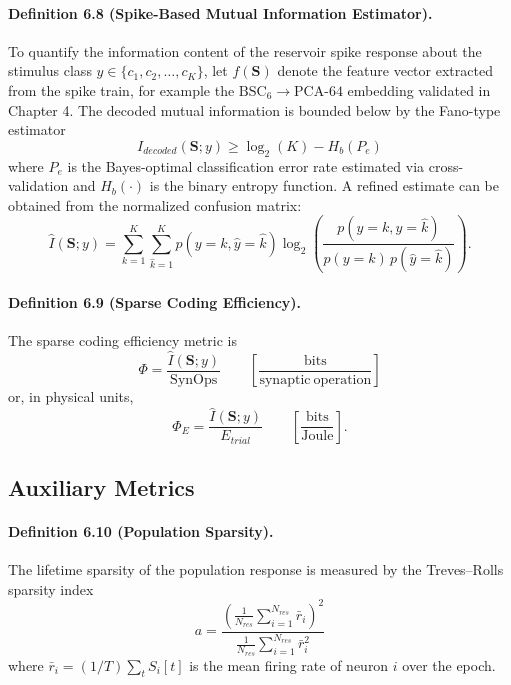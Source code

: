 \paragraph{Definition 6.8 (Spike-Based Mutual Information Estimator).}
To quantify the information content of the reservoir spike response about the stimulus class $y\in\{c_1,c_2,\ldots,c_K\}$, let $f(\mathbf{S})$ denote the feature vector extracted from the spike train, for example the $\mathrm{BSC}_6 \rightarrow \mathrm{PCA}\text{-}64$ embedding validated in Chapter 4. The decoded mutual information is bounded below by the Fano-type estimator
\begin{equation}
I_{decoded}(\mathbf{S};y) \ge \log_2(K) - H_b(P_e)
\end{equation}
where $P_e$ is the Bayes-optimal classification error rate estimated via cross-validation and $H_b(\cdot)$ is the binary entropy function. A refined estimate can be obtained from the normalized confusion matrix:
\begin{equation}
\hat{I}(\mathbf{S};y)=\sum_{k=1}^{K}\sum_{\hat{k}=1}^{K} p(y=k,\hat{y}=\hat{k})\log_2\!\left(\frac{p(y=k,\hat{y}=\hat{k})}{p(y=k)\,p(\hat{y}=\hat{k})}\right).
\end{equation}

\paragraph{Definition 6.9 (Sparse Coding Efficiency).}
The sparse coding efficiency metric is
\begin{equation}
\Phi = \frac{\hat{I}(\mathbf{S};y)}{\mathrm{SynOps}} \qquad \left[\frac{\mathrm{bits}}{\mathrm{synaptic\ operation}}\right]
\end{equation}
or, in physical units,
\begin{equation}
\Phi_E = \frac{\hat{I}(\mathbf{S};y)}{E_{trial}} \qquad \left[\frac{\mathrm{bits}}{\mathrm{Joule}}\right].
\end{equation}

\subsection{Auxiliary Metrics}

\paragraph{Definition 6.10 (Population Sparsity).}
The lifetime sparsity of the population response is measured by the Treves--Rolls sparsity index
\begin{equation}
a = \frac{\left(\frac{1}{N_{res}}\sum_{i=1}^{N_{res}} \bar{r}_i\right)^2}{\frac{1}{N_{res}}\sum_{i=1}^{N_{res}} \bar{r}_i^2}
\end{equation}
where $\bar{r}_i=(1/T)\sum_t S_i[t]$ is the mean firing rate of neuron $i$ over the epoch.

